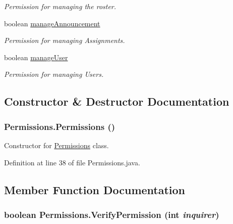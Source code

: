 \begin{CompactItemize}
\begin{CompactList}\small\item\em Permission for managing the roster. \item\end{CompactList}\item 
boolean \hyperlink{classPermissions_2bc565084a5e7f7f21fd126ef11be7bc}{manageAnnouncement}
\begin{CompactList}\small\item\em Permission for managing Assignments. \item\end{CompactList}\item 
boolean \hyperlink{classPermissions_23f340ecd5cffadea618bfdeebc15554}{manageUser}
\begin{CompactList}\small\item\em Permission for managing Users. \item\end{CompactList}\end{CompactItemize}


\subsection{Constructor \& Destructor Documentation}
\hypertarget{classPermissions_b4c550a272e6a05c4d883583bd95dd11}{
\subsubsection{\setlength{\rightskip}{0pt plus 5cm}Permissions.Permissions ()}}
\label{classPermissions_b4c550a272e6a05c4d883583bd95dd11}


Constructor for \hyperlink{classPermissions}{Permissions} class. 



Definition at line 38 of file Permissions.java.

\subsection{Member Function Documentation}
\hypertarget{classPermissions_e696edf1ce33ee98e5c066be8a243f5f}{
\subsubsection{\setlength{\rightskip}{0pt plus 5cm}boolean Permissions.VerifyPermission (int {\em inquirer})}}
\label{classPermissions_e696edf1ce33ee98e5c066be8a243f5f}


